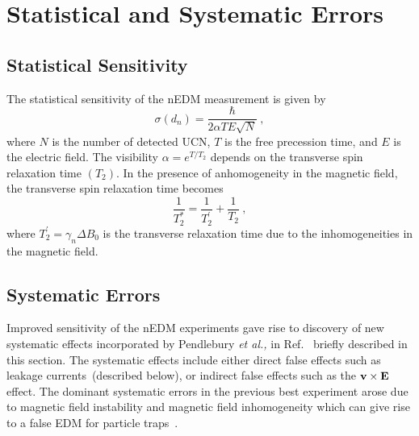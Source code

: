 \section{Statistical and Systematic Errors}
\subsection{Statistical Sensitivity}
The statistical sensitivity of the nEDM measurement is given by
\begin{equation}
  \label{eqn:dnsensitivity}
  \sigma(d_n) = \frac{\hbar}{2 \alpha T E \sqrt{N}}~,
\end{equation}
where $N$ is the number of detected UCN, $T$ is the free precession
time, and $E$ is the electric field. The visibility
$\alpha = e^{T/T_2}$ depends on the transverse spin relaxation time
$(T_2)$.  In the presence of anhomogeneity in the magnetic field, the
transverse spin relaxation time becomes
\begin{equation}
  \frac{1}{T_2^*} = \frac{1}{T_2^{\prime}} + \frac{1}{T_2}~,
\end{equation}
where $T_2^{\prime} = \gamma_n \Delta B_0$ is the transverse
relaxation time due to the inhomogeneities in the magnetic field.


\subsection{Systematic Errors~\label{sec:systematics}}

Improved sensitivity of the nEDM experiments gave rise to discovery of
new systematic effects incorporated by Pendlebury {\it{et al.,}} in
Ref.~\cite{Pendlebury2015} briefly described in this section. The
systematic effects include either direct false effects such as leakage
currents~(described below), or indirect false effects such as the
$\bf{v}\times\bf{E}$ effect.  The dominant systematic errors in the
previous best experiment arose due to magnetic field instability and
magnetic field inhomogeneity which can give rise to a false EDM for
particle traps~\cite{pendlebury2004}.




